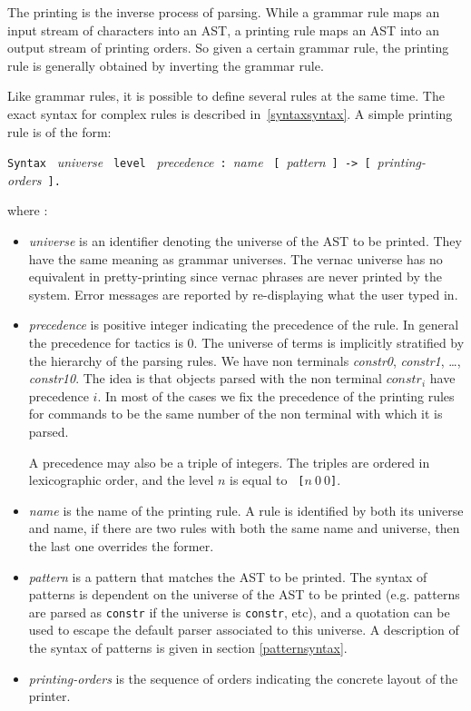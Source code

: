 The printing is the inverse process of parsing. While a grammar rule
maps an input stream of characters
into an AST, a printing
rule maps an AST into an output stream of printing orders. 
So given a certain grammar rule, the printing rule 
is generally obtained by inverting the grammar rule.

Like grammar rules, it is possible to define several rules at the same
time. The exact syntax for complex rules is described
in~\ref{syntaxsyntax}. A simple printing rule is of the form:

\begin{center}
\verb+Syntax+ ~{\sl universe}
~\verb+level+ ~{\sl precedence}~\verb+:+~{\sl name}
~\verb+[+~{\sl pattern}~\verb+] -> [+~{\sl printing-orders}~\verb+].+
\end{center}

where :
\begin{itemize}
\item {\it universe} is an identifier denoting the universe of the AST to
  be printed. They have the same meaning as grammar universes.
  The vernac universe has no equivalent in pretty-printing since
  vernac phrases are never printed by the system. Error messages are
  reported by re-displaying what the user typed in.

\item {\it precedence} is positive integer indicating the precedence
  of the rule. In general the precedence for tactics is 0. The
  universe of terms is implicitly stratified by the hierarchy of
  the parsing rules. We have non terminals \textit{constr0},
  \textit{constr1}, \ldots, \textit{constr10}. 
  The idea is that objects parsed with the non terminal
  $constr_i$ have precedence $i$. In most of the cases we fix the
  precedence of the printing rules for commands to be the same number
  of the non terminal with which it is parsed.

  A precedence may also be a triple of integers. The triples are
  ordered in lexicographic order, and the level $n$ is equal to {\tt
  [$n~0~0$]}.

\item {\it name} is the name of the
  printing rule. A rule is identified by both its universe and name,
  if there are two rules with both the same name and universe, then
  the last one overrides the former.

\item {\it pattern} is a pattern that matches the AST to be
  printed. 
The syntax of patterns is dependent on the universe of the AST to be
printed (e.g. patterns are parsed as {\tt constr} if the universe is
{\tt constr}, etc), and a quotation can be used to escape the default
parser associated to this universe.
A description of the syntax of patterns is given in section
  \ref{patternsyntax}.

\item {\it printing-orders} is the sequence of orders indicating the
  concrete layout of the printer.
\end{itemize}

